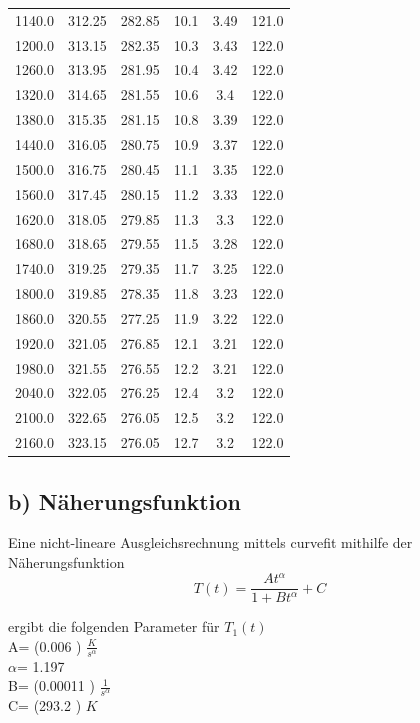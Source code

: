 \begin{table}
\begin{tabular}{cccccc}
1140.0 & 312.25 & 282.85 & 10.1 & 3.49 & 121.0 \\
1200.0 & 313.15 & 282.35 & 10.3 & 3.43 & 122.0 \\
1260.0 & 313.95 & 281.95 & 10.4 & 3.42 & 122.0 \\
1320.0 & 314.65 & 281.55 & 10.6 & 3.4 & 122.0 \\
1380.0 & 315.35 & 281.15 & 10.8 & 3.39 & 122.0 \\
1440.0 & 316.05 & 280.75 & 10.9 & 3.37 & 122.0 \\
1500.0 & 316.75 & 280.45 & 11.1 & 3.35 & 122.0 \\
1560.0 & 317.45 & 280.15 & 11.2 & 3.33 & 122.0 \\
1620.0 & 318.05 & 279.85 & 11.3 & 3.3 & 122.0 \\
1680.0 & 318.65 & 279.55 & 11.5 & 3.28 & 122.0 \\
1740.0 & 319.25 & 279.35 & 11.7 & 3.25 & 122.0 \\
1800.0 & 319.85 & 278.35 & 11.8 & 3.23 & 122.0 \\
1860.0 & 320.55 & 277.25 & 11.9 & 3.22 & 122.0 \\
1920.0 & 321.05 & 276.85 & 12.1 & 3.21 & 122.0 \\
1980.0 & 321.55 & 276.55 & 12.2 & 3.21 & 122.0 \\
2040.0 & 322.05 & 276.25 & 12.4 & 3.2 & 122.0 \\
2100.0 & 322.65 & 276.05 & 12.5 & 3.2 & 122.0 \\
2160.0 & 323.15 & 276.05 & 12.7 & 3.2 & 122.0 \\
\bottomrule
\end{tabular}
\end{table}
\newpage
\subsection{b) Näherungsfunktion}
Eine nicht-lineare Ausgleichsrechnung mittels curvefit mithilfe der Näherungsfunktion
\begin{equation}
\label{eqn:naeherungsfunktion}
T(t)=\frac{At^\alpha}{1+Bt^\alpha}+C
\end{equation}

ergibt die folgenden Parameter
für $T_1(t)$\\

A= (0.006 ) $\frac{K}{s^\alpha}$ \\
$\alpha$= 1.197  \\
B= (0.00011 ) $\frac{1}{s^\alpha}$\\
C= (293.2 ) $K$ \\

